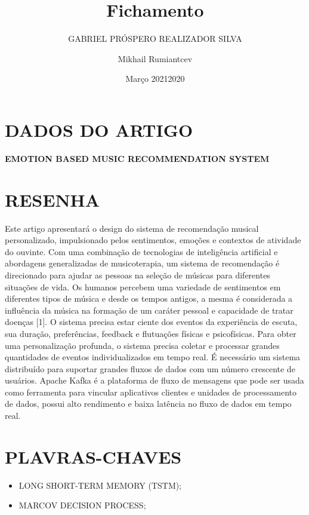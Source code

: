 \documentclass{article}
\title{Fichamento}
\author{GABRIEL PRÓSPERO REALIZADOR  SILVA}
\date{Março 2021}
\begin{document}
\maketitle

\section{DADOS DO ARTIGO}
\textbf{EMOTION BASED MUSIC RECOMMENDATION SYSTEM \\}
\author{Mikhail Rumiantcev \\}
\date{2020}

\section{RESENHA}
Este artigo apresentará o design do sistema de recomendação musical personalizado, impulsionado pelos sentimentos, emoções e contextos de atividade do ouvinte. Com uma combinação de tecnologias de inteligência artificial e abordagens generalizadas de musicoterapia, um sistema de recomendação é direcionado para ajudar as pessoas na seleção de músicas para diferentes situações de vida. Os humanos percebem uma variedade de sentimentos em diferentes tipos de música e desde os tempos antigos, a mesma é considerada a influência da música na formação de um caráter pessoal e capacidade de tratar doenças [1]. O sistema precisa estar ciente dos eventos da experiência de escuta, sua duração, preferências, feedback e flutuações físicas e psicofísicas. Para obter uma personalização profunda, o sistema precisa coletar e processar grandes quantidades de eventos individualizados em tempo real. É necessário um sistema distribuído para suportar grandes fluxos de dados com um número crescente de usuários. Apache Kafka é a plataforma de fluxo de mensagens que pode ser usada como ferramenta para vincular aplicativos clientes e unidades de processamento de dados, possui alto rendimento e baixa latência no fluxo de dados em tempo real. 

\section{PLAVRAS-CHAVES}
\begin{itemize}
    \item LONG SHORT-TERM MEMORY (TSTM); 
    \item MARCOV DECISION PROCESS;
\end{itemize}
\end{document}

